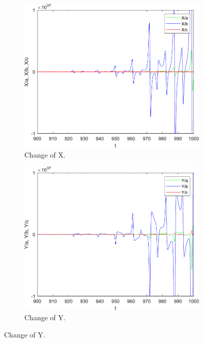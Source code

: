 	\begin{figure}[H]
        \centering
        \begin{subfigure}[b]{0.475\textwidth}
            \centering
            \includegraphics[scale=0.45]{files/dX_085.pdf}
            \caption{Change of X.}    
            \label{fig:dX_085}
        \end{subfigure}
        \hfill
        \begin{subfigure}[b]{0.475\textwidth}  
            \centering 
            \includegraphics[scale=0.45]{files/dY_085.pdf}
            \caption{Change of Y.}  

\end{subfigure}
\end{figure}
